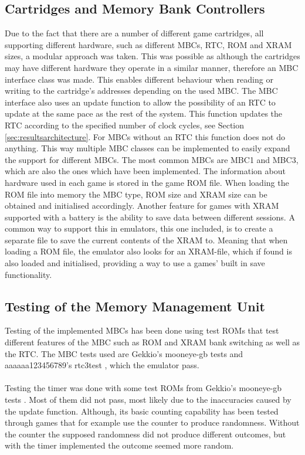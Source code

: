 

\subsection{Cartridges and Memory Bank Controllers}
Due to the fact that there are a number of different game cartridges, all supporting different hardware, such as different MBCs, RTC, ROM and XRAM sizes, a modular approach was taken. 
This was possible as although the cartridges may have different hardware they operate in a similar manner, therefore an MBC interface class was made.
This enables different behaviour when reading or writing to the cartridge's addresses depending on the used MBC. The MBC interface also uses an update function to allow the possibility of an RTC to update at the same pace as the rest of the system. This function updates the RTC according to the specified number of clock cycles, see Section \ref{sec:resultsarchitecture}. For MBCs without an RTC this function does not do anything. This way multiple MBC classes can be implemented to easily expand the support for different MBCs. The most common MBCs are MBC1 and MBC3, which are also the ones which have been implemented.
\newpage
The information about hardware used in each game is stored in the game ROM file.
When loading the ROM file into memory the MBC type, ROM size and XRAM size can be obtained and initialised accordingly. 
Another feature for games with XRAM supported with a battery is the ability to save data between different sessions.
A common way to support this in emulators, this one included, is to create a separate file to save the current contents of the XRAM to. Meaning that when loading a ROM file, the emulator also looks for an XRAM-file, which if found is also loaded and initialised, providing a way to use a games' built in save functionality.

\subsection{Testing of the Memory Management Unit}
Testing of the implemented MBCs has been done using test ROMs that test different features of the MBC such as ROM and XRAM bank switching as well as the RTC. The MBC tests used are Gekkio's mooneye-gb tests \cite{Gekkio-Mooneye} and aaaaaa123456789's rtc3test \cite{mbc3test}, which the emulator pass.
\\\\
Testing the timer was done with some test ROMs from Gekkio's mooneye-gb tests \cite{Gekkio-Mooneye}. Most of them did not pass, most likely due to the inaccuracies caused by the update function. Although, its basic counting capability has been tested through games that for example use the counter to produce randomness. Without the counter the supposed randomness did not produce different outcomes, but with the timer implemented the outcome seemed more random.

